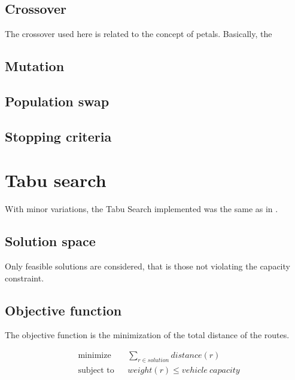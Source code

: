 \documentclass{article} %
\begin{document}
\subsection{Crossover}

The crossover used here is related to the concept of petals.
Basically, the

\subsection{Mutation}



\subsection{Population swap}



\subsection{Stopping criteria}


\newpage
\section{Tabu search}
\label{tabu_search}

With minor variations, the Tabu Search implemented was the same as in \citep{osman1993}.

\subsection{Solution space}

Only feasible solutions are considered, that is those not violating the capacity constraint.


\subsection{Objective function}

The objective function is the minimization of the total distance of the routes.

\begin{equation*}
\begin{aligned}
& \text{minimize}
& & \sum\limits_{r \in solution} distance(r) \\
& \text{subject to}
& & weight(r) \leq vehicle\ capacity
\end{aligned}
\end{equation*}
\end{document}
